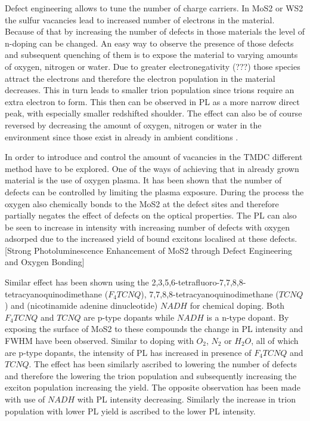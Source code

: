 	Defect engineering allows to tune the number of charge carriers. In MoS2 or WS2 the sulfur vacancies lead to increased number of electrons in the material. Because of that by increasing the number of defects in those materials the level of n-doping can be changed. An easy way to observe the presence of those defects and subsequent quenching of them is to expose the material to varying amounts of oxygen, nitrogen or water. Due to greater electronegativity (???) those species attract the electrons and therefore the electron population in the material decreases. This in turn leads to smaller trion population since trions require an extra electron to form. This then can be observed in PL as a more narrow direct peak, with especially smaller redshifted shoulder. The effect can also be of course reversed by decreasing the amount of oxygen, nitrogen or water in the environment since those exist in already in ambient conditions \cite{Currie2015}.
	
	In order to introduce and control the amount of vacancies in the TMDC different method have to be explored. One of the ways of achieving that in already grown material is the use of oxygen plasma. It has been shown that the number of defects can be controlled by limiting the plasma exposure. During the process the oxygen also chemically bonds to the MoS2 at the defect sites and therefore partially negates the effect of defects on the optical properties. The PL can also be seen to increase in intensity with increasing number of defects with oxygen adsorped due to the increased yield of bound excitons localised at these defects. [Strong Photoluminescence Enhancement of MoS2 through Defect Engineering and Oxygen Bonding]
	
	Similar effect has been shown using the 2,3,5,6-tetrafluoro-7,7,8,8-tetracyanoquinodimethane ($F_4TCNQ$), 7,7,8,8-tetracyanoquinodimethane ($TCNQ$) and (nicotinamide adenine dinucleotide) $NADH$ for chemical doping. Both $F_4TCNQ$ and $TCNQ$ are p-type dopants while $NADH$ is a n-type dopant. By exposing the surface of MoS2 to these compounds the change in PL intensity and FWHM have been observed. Similar to doping with $O_2$, $N_2$ or $H_2O$, all of which are p-type dopants, the intensity of PL has increased in presence of $F_4TCNQ$ and $TCNQ$. The effect has been similarly ascribed to lowering the number of defects and therefore the lowering the trion population and subsequently increasing the exciton population increasing the yield. The opposite observation has been made with use of $NADH$ with PL intensity decreasing. Similarly the increase in trion population with lower PL yield is ascribed to the lower PL intensity. \cite{Mouri2013}
	
